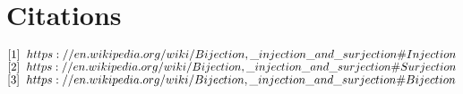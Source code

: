 \documentclass[11pt]{article}
\begin{document}
\newpage
\section*{Citations}
$
\lbrack 1 \rbrack \hspace{2mm}  https://en.wikipedia.org/wiki/Bijection,\_injection\_and\_surjection\#Injection
$
\\
$
\lbrack 2 \rbrack \hspace{2mm}  https://en.wikipedia.org/wiki/Bijection,\_injection\_and\_surjection\#Surjection
$
\\
$
\lbrack 3 \rbrack \hspace{2mm}  https://en.wikipedia.org/wiki/Bijection,\_injection\_and\_surjection\#Bijection
$
\end{document}
